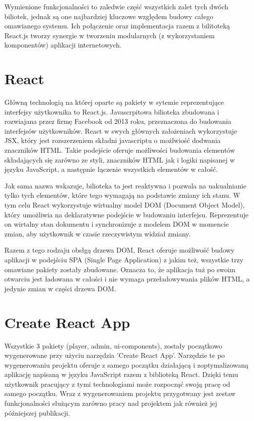 Wymienione funkcjonalności to zaledwie część wszystkich zalet tych dwóch biliotek, jednak są one najbardziej kluczowe względem budowy całego omawianego systemu. Ich połączenie oraz implementacja razem z bilitoteką React.js tworzy synergie w tworzeniu modularnych (z wykorzystaniem komponentów) aplikacji internetowych. 


\section{React}
Główną technologią na której oparte są pakiety w sytemie reprezentujące interfejsy użytkownika to React.js. Javascrpitowa bilioteka zbudowana i rozwiajana przez firmę Facebook od 2013 roku, przeznaczona do budowania interfejsów użytkowników. React w swych głównych założeniach wykorzystuje JSX, który jest rozszerzeniem składni javascriptu o możlwiość dodwania znaczników HTML. Takie podejście oferuje możliwości budowania elementów składających się zarówno ze styli, znaczników HTML jak i logiki napisanej w języku JavaScript, a następnie łączenie wszystkich elementów w całość.

Jak sama nazwa wskazuje, bilioteka ta jest reaktywna i pozwala na uakualnianie tylko tych elementów, które tego wymagają na podstawie zmiany ich stanu. W tym celu React wykorzystuje wirtualny model DOM (Document Object Model), który umożliwia na deklaratywne podejście w budowaniu interfejsu. Reprezentuje on wirtalny stan dokumentu i synchronizuje z modelem DOM w momencie zmian, aby użytkownik w czasie rzeczywistym widział zmiany.

Razem z tego rodzaju obsłgą drzewa DOM, React oferuje możliwość budowy aplikacji w podejściu SPA (Single Page Application) z jakim też, wszystkie trzy omawiane pakiety zostały zbudowane. Oznacza to, że aplikacja tuż po swoim otwarciu jest ładowana w całości i nie wymaga przeładowywania plików HTML, a jedynie zmian w części drzewa DOM.

\section{Create React App}
Wszystkie 3 pakiety (player, admin, ui-components), zostały początkowo wygenerowane przy użyciu narzędzia 'Create React App'. Narzędzie te po wygenerowaniu projektu oferuje z samego początku działającą i zoptymalizowaną aplikację napisaną w języku JavaScript razem z biblioteką React. Dzięki temu użytkownik pracujący z tymi technologiami może rozpocząć swoją pracę od samego początku. Wraz z wygenerowaniem projektu przygotwany jest zestaw funkcjonalności służącym zarówno pracy nad projektem jak również jej późniejszej publikacji.


